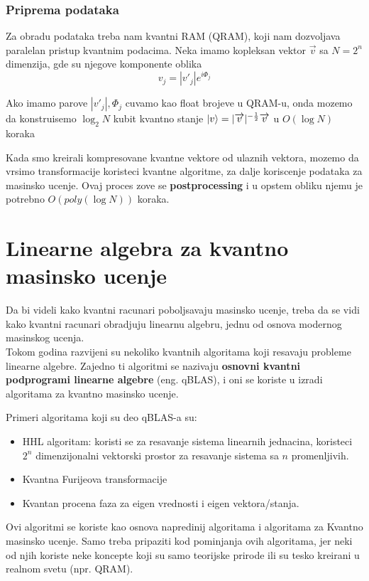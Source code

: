 \documentclass[12pt, letterpaper, oneside]{article}
\begin{document}
\subsubsection{Priprema podataka}
Za obradu podataka treba nam kvantni RAM (QRAM), koji nam dozvoljava paralelan pristup kvantnim podacima. 
Neka imamo kopleksan vektor $\overrightarrow{v}$ sa $N=2^n$ dimenzija, gde su njegove komponente oblika 
\[
    v_j = |v'_j|e^{i\varPhi_j}
\]

Ako imamo parove ${|v'_j|,\varPhi_j}$ cuvamo kao float brojeve u QRAM-u, onda mozemo da konstruisemo
$\log_{2}N$ kubit kvantno stanje $\ket{v} = |\overrightarrow{v}|^{-\frac{1}{2}}\overrightarrow{v}$ u $O(\log N)$ koraka

Kada smo kreirali kompresovane kvantne vektore od ulaznih vektora, mozemo da vrsimo transformacije koristeci kvantne algoritme, za dalje koriscenje podataka za masinsko ucenje.
Ovaj proces zove se \textbf{postprocessing} i u opstem obliku njemu je potrebno $O(poly(\log{}N))$ koraka. \cite{lloyd2013quantum}


\section{Linearne algebra za kvantno masinsko ucenje}
Da bi videli kako kvantni racunari poboljsavaju masinsko ucenje, treba da se vidi kako kvantni racunari obradjuju linearnu algebru, jednu od osnova modernog masinskog ucenja. \\
Tokom godina razvijeni su nekoliko kvantnih algoritama koji resavaju probleme linearne algebre.
Zajedno ti algoritmi se nazivaju \textbf{osnovni kvantni podprogrami linearne algebre} (eng. qBLAS), i oni se koriste u izradi algoritama za kvantno masinsko ucenje.

Primeri algoritama koji su deo qBLAS-a su: 
\begin{itemize}
    \item HHL algoritam: koristi se za resavanje sistema linearnih jednacina, koristeci $2^n$ dimenzijonalni vektorski prostor
        za resavanje sistema sa $n$ promenljivih. \cite{Quantum_machine_learning}
    \item Kvantna Furijeova transformacije \cite{Classical&quantum_info_Fourie_Phase}
    \item Kvantan procena faza za eigen vrednosti i eigen vektora/stanja. \cite{Classical&quantum_info_Fourie_Phase}
\end{itemize}
Ovi algoritmi se koriste kao osnova napredinij algoritama i algoritama za Kvantno masinsko ucenje.
Samo treba pripaziti kod pominjanja ovih algoritama, jer neki od njih koriste neke koncepte koji su samo
teorijske prirode ili su tesko kreirani u realnom svetu (npr. QRAM).
\end{document}
